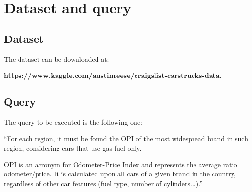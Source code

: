 \chapter{Dataset and query}

\section{Dataset}

The dataset can be downloaded at: 

\textbf{https://www.kaggle.com/austinreese/craigslist-carstrucks-data}.




\section{Query}

The query to be executed is the following one:

\bigskip

``For each region, it must be found the OPI of the most widespread brand in such region, considering cars that use gas fuel only. 

OPI is an acronym for Odometer-Price Index and represents the average ratio odometer/price. It is calculated upon all cars of a given brand in the country, regardless of other car features (fuel type, number of cylinders...).''


\bigskip